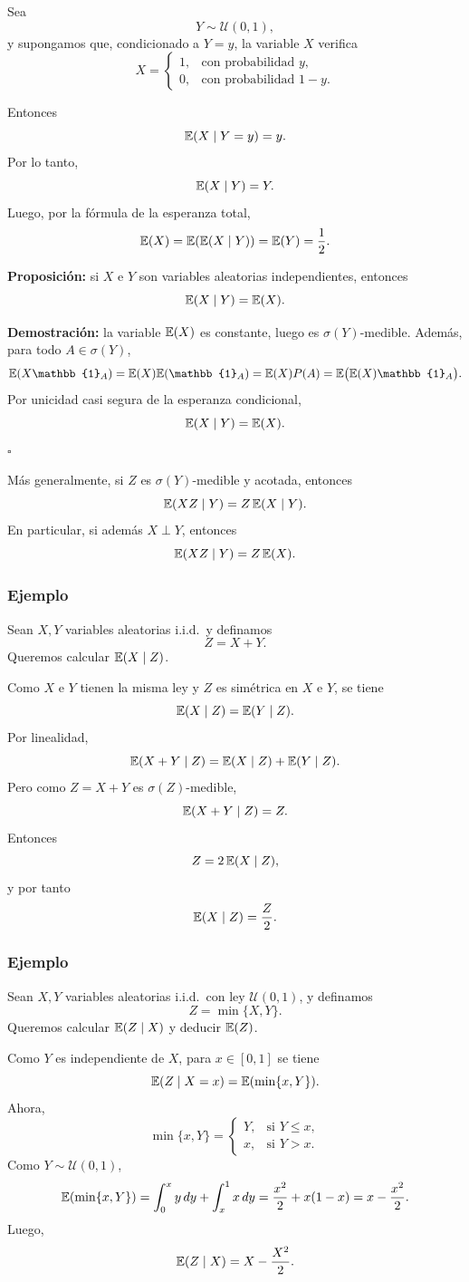 Sea
\[
Y\sim \mathcal{U}(0,1),
\]
y supongamos que, condicionado a \(Y=y\), la variable \(X\) verifica
\[
X=
\begin{cases}
1, & \text{con probabilidad } y,\\
0, & \text{con probabilidad } 1-y.
\end{cases}
\]

Entonces
\[
\mathbb{E}(X\mid Y=y)=y.
\]
Por lo tanto,
\[
\mathbb{E}(X\mid Y)=Y.
\]
Luego, por la fórmula de la esperanza total,
\[
\mathbb{E}(X)=\mathbb{E}(\mathbb{E}(X\mid Y))=\mathbb{E}(Y)=\frac12.
\]

\medskip

\noindent
\textbf{Proposición:} si \(X\) e \(Y\) son variables aleatorias independientes, entonces
\[
\mathbb{E}(X\mid Y)=\mathbb{E}(X).
\]

\textbf{Demostración:} la variable \(\mathbb{E}(X)\) es constante, luego es \(\sigma(Y)\)-medible. Además, para todo \(A\in\sigma(Y)\),
\[
\E(X\mathbb{1}_A)=\E(X)\E(\mathbb{1}_A)=\E(X)P(A)
=
\E\big(\E(X)\mathbb{1}_A\big).
\]
Por unicidad casi segura de la esperanza condicional,
\[
\mathbb{E}(X\mid Y)=\mathbb{E}(X).
\]
\hfill \(\square\)

\medskip

\noindent
Más generalmente, si \(Z\) es \(\sigma(Y)\)-medible y acotada, entonces
\[
\mathbb{E}(XZ\mid Y)=Z\,\mathbb{E}(X\mid Y).
\]
En particular, si además \(X\perp Y\), entonces
\[
\mathbb{E}(XZ\mid Y)=Z\,\mathbb{E}(X).
\]

\subsubsection*{Ejemplo}

Sean \(X,Y\) variables aleatorias i.i.d.\ y definamos
\[
Z=X+Y.
\]
Queremos calcular \(\mathbb{E}(X\mid Z)\).

Como \(X\) e \(Y\) tienen la misma ley y \(Z\) es simétrica en \(X\) e \(Y\), se tiene
\[
\mathbb{E}(X\mid Z)=\mathbb{E}(Y\mid Z).
\]
Por linealidad,
\[
\mathbb{E}(X+Y\mid Z)=\mathbb{E}(X\mid Z)+\mathbb{E}(Y\mid Z).
\]
Pero como \(Z=X+Y\) es \(\sigma(Z)\)-medible,
\[
\mathbb{E}(X+Y\mid Z)=Z.
\]
Entonces
\[
Z=2\,\mathbb{E}(X\mid Z),
\]
y por tanto
\[
\mathbb{E}(X\mid Z)=\frac{Z}{2}.
\]

\subsubsection*{Ejemplo}

Sean \(X,Y\) variables aleatorias i.i.d.\ con ley \(\mathcal{U}(0,1)\), y definamos
\[
Z=\min\{X,Y\}.
\]
Queremos calcular \(\mathbb{E}(Z\mid X)\) y deducir \(\mathbb{E}(Z)\).

Como \(Y\) es independiente de \(X\), para \(x\in[0,1]\) se tiene
\[
\mathbb{E}(Z\mid X=x)=\mathbb{E}(\min\{x,Y\}).
\]
Ahora,
\[
\min\{x,Y\}
=
\begin{cases}
Y, & \text{si } Y\leq x,\\
x, & \text{si } Y>x.
\end{cases}
\]
Como \(Y\sim \mathcal{U}(0,1)\),
\[
\mathbb{E}(\min\{x,Y\})
=
\int_0^x y\,dy+\int_x^1 x\,dy
=
\frac{x^2}{2}+x(1-x)
=
x-\frac{x^2}{2}.
\]
Luego,
\[
\mathbb{E}(Z\mid X)=X-\frac{X^2}{2}.
\]

